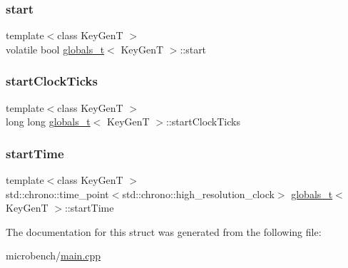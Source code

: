 \mbox{\label{structglobals__t_a8116065e907a3ac2c87229e167ad76fd}} 
\subsubsection{\texorpdfstring{start}{start}}
{\footnotesize\ttfamily template$<$class Key\+GenT $>$ \\
volatile bool \hyperlink{structglobals__t}{globals\+\_\+t}$<$ Key\+GenT $>$\+::start}

\mbox{\label{structglobals__t_a2b5c5db84f6abc24cdc5d752984be6eb}} 
\subsubsection{\texorpdfstring{start\+Clock\+Ticks}{startClockTicks}}
{\footnotesize\ttfamily template$<$class Key\+GenT $>$ \\
long long \hyperlink{structglobals__t}{globals\+\_\+t}$<$ Key\+GenT $>$\+::start\+Clock\+Ticks}

\mbox{\label{structglobals__t_a3585908ff51ae63a70f0db1fccb520ae}} 
\subsubsection{\texorpdfstring{start\+Time}{startTime}}
{\footnotesize\ttfamily template$<$class Key\+GenT $>$ \\
std\+::chrono\+::time\+\_\+point$<$std\+::chrono\+::high\+\_\+resolution\+\_\+clock$>$ \hyperlink{structglobals__t}{globals\+\_\+t}$<$ Key\+GenT $>$\+::start\+Time}



The documentation for this struct was generated from the following file\+:\begin{DoxyCompactItemize}
\item 
microbench/\hyperlink{microbench_2main_8cpp}{main.\+cpp}\end{DoxyCompactItemize}
